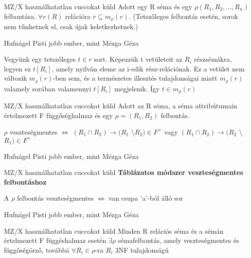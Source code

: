 \begin{tetel}{MZ/X használhatatlan cuccokat küld} Adott egy R séma és egy $\rho(R_1,R_2,\ldots,R_n)$ felbontása. $\forall r(R)$ relációra $r \subseteq m_\rho(r).$ (Tetszőleges felbontás esetén, sorok nem tűnhetnek el, csak újak keletkezhetnek.)
\end{tetel}

  \begin{bizonyitas}{Hufnágel Pisti jobb ember, mint Mézga Géza}

  Vegyünk egy tetszőleges $t \in r$ sort. Képezzük t vetületeit az $R_i$ részsémákra, legyen ez $t[R_i]$, amely nyilván eleme az i-edik rész-relációnak. Ez a vetület nem változik $m_\rho(r)$-ben sem, és a természetes illesztés tulajdonságai miatt $m_\rho (r)$ valamely sorában valamennyi $t[R_i]$ megjelenik. Így $t \in m_\rho (r)$
\end{bizonyitas}

\begin{tetel}{MZ/X használhatatlan cuccokat küld} Adott az R séma, a séma attribútumain értelmezett F függőséghalmaz és egy $\rho = (R_1,R_2)$ felbontás.

  $\rho$ veszteségmentes $\Longleftrightarrow$ $(R_1 \cap R_2) \rightarrow (R_1$ \textbackslash $R_2) \in F^+$ vagy $ (R_1 \cap R_2) \rightarrow (R_2$ \textbackslash $R_1) \in F^+$
\end{tetel}

\begin{bizonyitas}{Hufnágel Pisti jobb ember, mint Mézga Géza} %
\end{bizonyitas}
\begin{tetel}{MZ/X használhatatlan cuccokat küld} \textbf{Táblázatos módszer veszteségmentes felbontáshoz}

A $\rho$ felbontás veszteségmentes $\Longleftrightarrow$ van csupa 'a'-ból álló sor
\end{tetel}
  \begin{bizonyitas}{Hufnágel Pisti jobb ember, mint Mézga Géza} %
\end{bizonyitas}
\begin{tetel}{MZ/X használhatatlan cuccokat küld} Minden R relációs séma és a sémán értelmezett F függéshalmaz esetén $\exists \rho$ sémafelbontás, amely veszteségmentes és függőségörző, továbbá $\forall R_i \in \rho$-ra $R_i$ 3NF tulajdonságú
\end{tetel}

